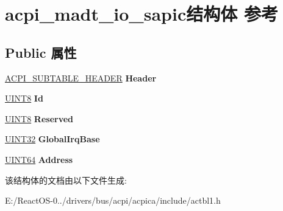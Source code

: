 \hypertarget{structacpi__madt__io__sapic}{}\section{acpi\+\_\+madt\+\_\+io\+\_\+sapic结构体 参考}
\label{structacpi__madt__io__sapic}
\subsection*{Public 属性}
\begin{DoxyCompactItemize}
\item 
\mbox{\label{structacpi__madt__io__sapic_a91a5d3397a01cd948960c117e45047fe}} 
\hyperlink{structacpi__subtable__header}{A\+C\+P\+I\+\_\+\+S\+U\+B\+T\+A\+B\+L\+E\+\_\+\+H\+E\+A\+D\+ER} {\bfseries Header}
\item 
\mbox{\label{structacpi__madt__io__sapic_a533dc5a3fa5023eca61df1994e098cdc}} 
\hyperlink{_processor_bind_8h_ab27e9918b538ce9d8ca692479b375b6a}{U\+I\+N\+T8} {\bfseries Id}
\item 
\mbox{\label{structacpi__madt__io__sapic_abd523dc9aa3c066930e9352a76acc379}} 
\hyperlink{_processor_bind_8h_ab27e9918b538ce9d8ca692479b375b6a}{U\+I\+N\+T8} {\bfseries Reserved}
\item 
\mbox{\label{structacpi__madt__io__sapic_ad72a792dc64abe3d2a1d44e4538650bd}} 
\hyperlink{_processor_bind_8h_ae1e6edbbc26d6fbc71a90190d0266018}{U\+I\+N\+T32} {\bfseries Global\+Irq\+Base}
\item 
\mbox{\label{structacpi__madt__io__sapic_ac7b54c489f7d19d077a6f101c7e41337}} 
\hyperlink{_processor_bind_8h_a57be03562867144161c1bfee95ca8f7c}{U\+I\+N\+T64} {\bfseries Address}
\end{DoxyCompactItemize}


该结构体的文档由以下文件生成\+:\begin{DoxyCompactItemize}
\item 
E\+:/\+React\+O\+S-\/0../drivers/bus/acpi/acpica/include/actbl1.\+h\end{DoxyCompactItemize}
